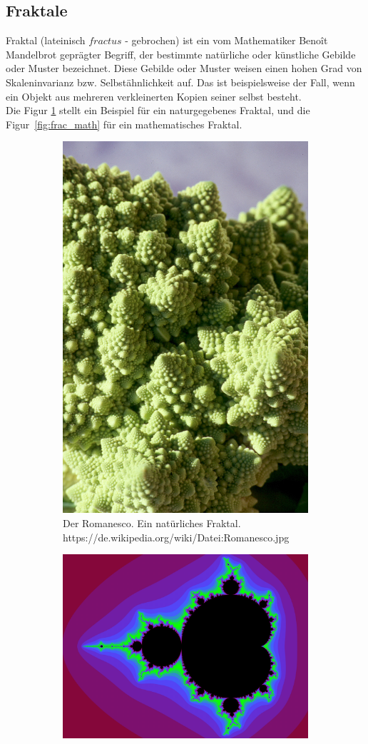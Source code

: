 \documentclass[a4paper,12pt]{llncs}
\makeatletter
\newcommand\nocaption{%
	\renewcommand\p@subfigure{}
	\renewcommand\thesubfigure{\thefigure\alph{subfigure}}
}
\numberwithin{equation}{section}
\makeatother
\begin{document}
\subsection{Fraktale}
Fraktal (lateinisch $fractus$ - gebrochen) ist ein vom Mathematiker Benoît Mandelbrot geprägter Begriff, der bestimmte natürliche oder künstliche Gebilde oder Muster bezeichnet. 
Diese Gebilde oder Muster weisen einen hohen Grad von Skaleninvarianz bzw. Selbstähnlichkeit auf. 
Das ist beispielsweise der Fall, wenn ein Objekt aus mehreren verkleinerten Kopien seiner selbst besteht.~\cite{fraktal} \\
Die Figur \ref{fig:frac_natur} stellt ein Beispiel für ein naturgegebenes Fraktal, und die Figur~\ref{fig:frac_math} für ein mathematisches Fraktal.
\begin{figure}[ht]   
	\nocaption
	\begin{subfigure}{.5\textwidth}
		\centering
		\includegraphics[width=.6\linewidth]{figures/Romanesco}
		\caption{Der Romanesco. Ein natürliches Fraktal.\\\tiny{https://de.wikipedia.org/wiki/Datei:Romanesco.jpg}}
		\label{fig:frac_natur}
	\end{subfigure}%
	\begin{subfigure}{.5\textwidth}
		\centering
		\includegraphics[width=.9\linewidth, angle =90 ]{figures/Mandelbrot}

\end{subfigure}
\end{figure}
\end{document}
